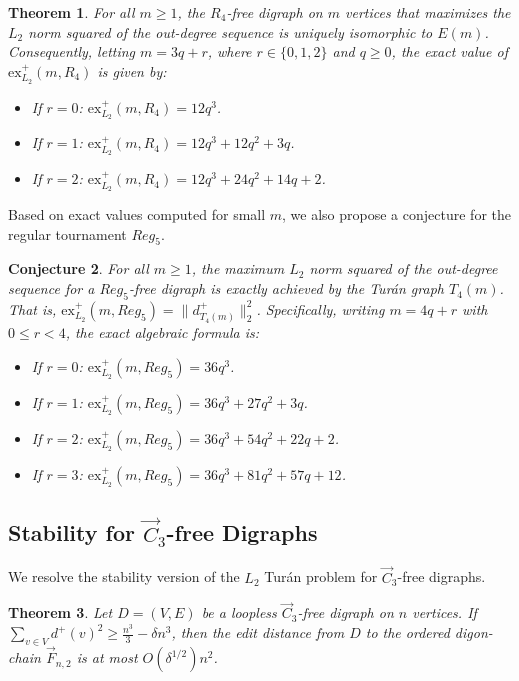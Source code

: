 \documentclass[a4paper]{amsart}
\newtheorem{theorem}{Theorem}[section]
\newtheorem{conjecture}[theorem]{Conjecture}
\begin{document}
\begin{theorem}\label{thm:r4}
    For all $m \ge 1$, the $R_4$-free digraph on $m$ vertices that maximizes the $L_2$ norm squared of the out-degree sequence is uniquely isomorphic to $E(m)$.
    Consequently, letting $m = 3q + r$, where $r \in \{0, 1, 2\}$ and $q \ge 0$, the exact value of $\text{ex}^+_{L_2}(m, R_4)$ is given by:
    \begin{itemize}
        \item If $r = 0$: $\text{ex}^+_{L_2}(m, R_4) = 12q^3$.
        \item If $r = 1$: $\text{ex}^+_{L_2}(m, R_4) = 12q^3 + 12q^2 + 3q$.
        \item If $r = 2$: $\text{ex}^+_{L_2}(m, R_4) = 12q^3 + 24q^2 + 14q + 2$.
    \end{itemize}
\end{theorem}

Based on exact values computed for small $m$, we also propose a conjecture for the regular tournament $Reg_5$.

\begin{conjecture}
For all $m \ge 1$, the maximum $L_2$ norm squared of the out-degree sequence for a $Reg_5$-free digraph is exactly achieved by the Tur\'an graph $T_4(m)$. That is, $\text{ex}^+_{L_2}(m, Reg_5) = \|d^+_{T_4(m)}\|_2^2$.
Specifically, writing $m = 4q + r$ with $0 \le r < 4$, the exact algebraic formula is:
\begin{itemize}
    \item If $r = 0$: $\text{ex}^+_{L_2}(m, Reg_5) = 36q^3$.
    \item If $r = 1$: $\text{ex}^+_{L_2}(m, Reg_5) = 36q^3 + 27q^2 + 3q$.
    \item If $r = 2$: $\text{ex}^+_{L_2}(m, Reg_5) = 36q^3 + 54q^2 + 22q + 2$.
    \item If $r = 3$: $\text{ex}^+_{L_2}(m, Reg_5) = 36q^3 + 81q^2 + 57q + 12$.
\end{itemize}
\end{conjecture}

\subsection{Stability for $\vec{C}_3$-free Digraphs}

We resolve the stability version of the $L_2$ Tur\'an problem for $\vec{C}_3$-free digraphs.

\begin{theorem} \label{thm:stability}
Let $D = (V, E)$ be a loopless $\vec{C}_3$-free digraph on $n$ vertices.
If $\sum_{v \in V} d^+(v)^2 \ge \frac{n^3}{3} - \delta n^3$,
then the edit distance from $D$ to the ordered digon-chain $\vec{F}_{n,2}$ is at most $O(\delta^{1/2}) n^2$.
\end{theorem}
\end{document}
